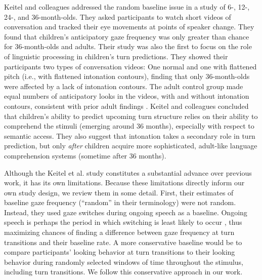 \documentclass[authoryear, 12pt]{elsarticle}
\begin{document}

Keitel and colleagues \citeyearpar{keitel2013} addressed the random baseline issue in a study of 6-, 12-, 24-, and 36-month-olds. They asked participants to watch short videos of conversation and tracked their eye movements at points of speaker change. They found that children's anticipatory gaze frequency was only greater than chance for 36-month-olds and adults. Their study was also the first to focus on the role of linguistic processing in children's turn predictions. They showed their participants two types of conversation videos: One normal and one with flattened pitch (i.e., with flattened intonation contours), finding that only 36-month-olds were affected by a lack of intonation contours. The adult control group made equal numbers of anticipatory looks in the videos, with and without intonation contours, consistent with prior adult findings \citep{de-ruiter2006}. Keitel and colleagues concluded that children's ability to predict upcoming turn structure relies on their ability to comprehend the stimuli (emerging around 36 months), especially with respect to semantic access. They also suggest that intonation takes a secondary role in turn prediction, but only \textit{after} children acquire more sophisticated, adult-like language comprehension systems (sometime after 36 months).

Although the Keitel et al. \citeyearpar{keitel2013} study constitutes a substantial advance over previous work, it has its own limitations. Because these limitations directly inform our own study design, we review them in some detail. First, their estimates of baseline gaze frequency (``random'' in their terminology) were not random. Instead, they used gaze switches during ongoing speech as a baseline. Ongoing speech is perhaps the period in which switching is least likely to occur \citep{hirvenkari2013}, thus maximizing chances of finding a difference between gaze frequency at turn transitions and their baseline rate. A more conservative baseline would be to compare participants' looking behavior at turn transitions to their looking behavior during randomly selected windows of time throughout the stimulus, including turn transitions. We follow this conservative approach in our work. 
\end{document}
